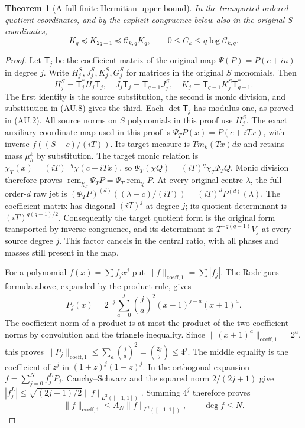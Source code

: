 \documentclass[11pt]{article}
\newtheorem{theorem}{Theorem}[section]
\begin{document}
\begin{theorem}[A full finite Hermitian upper bound]
In the transported ordered quotient coordinates, and by the explicit
congruence below also in the original $S$ coordinates,
\[
 \boxed{K_q\preceq K_{2q-1}\preceq\mathcal C_{k,q}K_q,
 \qquad 0\le C_k\le q\log\mathcal C_{k,q}.}               \tag{AU.25}
\]
\end{theorem}
\begin{proof}
Let $\mathsf T_j$ be the coefficient matrix of the original map
$\Psi(P)=P(c+iu)$ in degree $j$. Write $H_j^S,J_j^S,K_j^S,G_j^S$
for matrices in the original $S$ monomials. Then
\[
 H_j^S=\mathsf T_j^*H_j\mathsf T_j,\quad
 J_j\mathsf T_j=\mathsf T_{q-1}J_j^S,\quad
 K_j=\mathsf T_{q-1}K_j^S\mathsf T_{q-1}^*.
\]
The first identity is the source substitution, the second is monic
division, and substitution in (AU.8) gives the third. Each
$\det\mathsf T_j$ has modulus one, as proved in (AU.2).
All source norms on $S$ polynomials in this proof use $H_j^S$.
The exact auxiliary coordinate map used in this proof is
$\Psi_TP(x)=P(c+iTx)$, with inverse $f((S-c)/(iT))$. Its target
measure is $T m_k(Tx)dx$ and retains mass $\mu_h^k$ by substitution.
The target monic relation is
$\chi_T(x)=(iT)^{-q}\chi(c+iTx)$, so
$\Psi_T(\chi Q)=(iT)^q\chi_T\Psi_TQ$.
Monic division therefore proves
$\operatorname{rem}_{\chi_T}\Psi_TP=\Psi_T\operatorname{rem}_\chi P$.
At every original centre $\lambda$, the full order-$d$ raw jet is
$(\Psi_TP)^{(d)}((\lambda-c)/(iT))=(iT)^dP^{(d)}(\lambda)$.
The coefficient matrix has diagonal $(iT)^j$ at degree $j$;
its quotient determinant is $(iT)^{q(q-1)/2}$. Consequently the
target quotient form is the original form transported by inverse
congruence, and its determinant is $T^{-q(q-1)}V_j$ at every source
degree $j$. This factor cancels in the central ratio, with all phases
and masses still present in the map.

For a polynomial $f(x)=\sum f_jx^j$ put
$\|f\|_{\mathrm{coeff},1}=\sum|f_j|$. The Rodrigues formula above,
expanded by the product rule, gives
\[
 P_j(x)=2^{-j}\sum_{a=0}^j\binom ja^2(x-1)^{j-a}(x+1)^a.
\]
The coefficient norm of a product is at most the product of the two
coefficient norms by convolution and the triangle inequality. Since
$\|(x\pm1)^a\|_{\mathrm{coeff},1}=2^a$, this proves
$\|P_j\|_{\mathrm{coeff},1}\le\sum_a\binom ja^2
=\binom{2j}{j}\le4^j$. The middle equality is the coefficient of
$z^j$ in $(1+z)^j(1+z)^j$. In the orthogonal expansion
$f=\sum_{j=0}^Nf_j^LP_j$, Cauchy--Schwarz and the squared norm
$2/(2j+1)$ give
$|f_j^L|\le\sqrt{(2j+1)/2}\|f\|_{L^2([-1,1])}$.
Summing $4^j$ therefore proves
\[
 \|f\|_{\mathrm{coeff},1}
       \le A_N\|f\|_{L^2([-1,1])},\qquad\deg f\le N.    \tag{AU.26}
\]


\end{proof}
\end{document}
